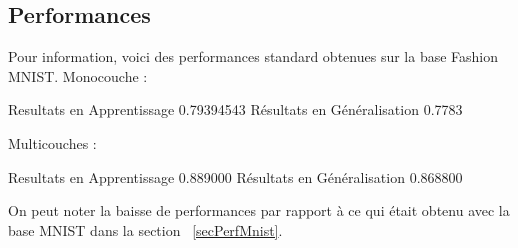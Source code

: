 \documentclass[a4paper,11pt]{book}
\begin{document}



\subsection{Performances}
\label{secPerfFMnist}

Pour information, voici des performances standard obtenues sur la base Fashion MNIST.
Monocouche :
\begin{myoutput}
Resultats en Apprentissage 0.79394543
Résultats en Généralisation 0.7783
\end{myoutput}

Multicouches :
\begin{myoutput}
Resultats en Apprentissage 0.889000
Résultats en Généralisation 0.868800
\end{myoutput}

On peut noter la baisse de performances par rapport à ce qui était obtenu avec la base MNIST dans la section ~\ref{secPerfMnist}.
\end{document}
